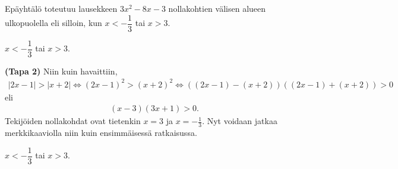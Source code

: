\begin{esimerkki}
\begin{esimratk}
Epäyhtälö toteutuu lausekkeen $3x^2-8x-3$ nollakohtien välisen alueen ulkopuolella eli silloin, kun $x<-\dfrac{1}{3}$ tai $x>3$.
\end{esimratk}

\begin{esimvast}
$x<-\dfrac{1}{3}$ tai $x>3$.
\end{esimvast}

\begin{esimratk} \textbf{(Tapa 2)}
Niin kuin havaittiin,
\begin{align*}
|2x-1| > |x+2| \Leftrightarrow (2x-1)^2 > (x+2)^2 \Leftrightarrow ((2x-1)-(x+2))((2x-1)+(x+2)) > 0
\end{align*}
eli
\begin{align*}
(x-3)(3x+1)>0.
\end{align*}
Tekijöiden nollakohdat ovat tietenkin $x = 3$ ja $x = -\frac{1}{3}$. Nyt voidaan jatkaa merkkikaaviolla niin kuin ensimmäisessä ratkaisussa.
\end{esimratk}
\begin{esimvast}
$x<-\dfrac{1}{3}$ tai $x>3$.
\end{esimvast}
\end{esimerkki}
